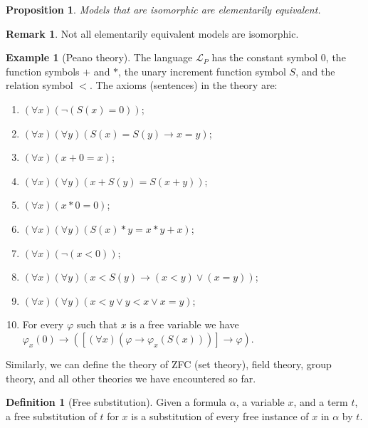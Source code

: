 \documentclass[11pt,a4paper]{article}
\theoremstyle{definition}
\newtheorem{definition}{Definition}[section]
\newtheorem{remark}{Remark}[section]
\newtheorem{example}{Example}[section]
\theoremstyle{plain}
\newtheorem{proposition}[theorem]{Proposition}
\renewcommand{\L}{\mathcal{L}}
\renewcommand{\implies}{\rightarrow}
\begin{document}
  \begin{proposition}
    Models that are isomorphic are elementarily equivalent.
  \end{proposition}
  \begin{remark}
    Not all elementarily equivalent models are isomorphic.
  \end{remark}

  \begin{example}[Peano theory]
    The language $\L_P$ has the constant symbol $0$, the function symbols
    $+$ and $*$, the unary increment function symbol $S$, and the relation
    symbol $<$. The axioms (sentences) in the theory are:
    \begin{enumerate}
      \item [(1)] $(\forall x)(\neg (S(x) = 0))$;
      \item [(2)] $(\forall x)(\forall y)(S(x) = S(y) \implies x =y)$;
      \item [(3)] $(\forall x)(x + 0 = x)$;
      \item [(4)] $(\forall x)(\forall y)(x + S(y) = S(x + y))$;
      \item [(5)] $(\forall x)(x * 0 = 0)$;
      \item [(6)] $(\forall x)(\forall y)(S(x) * y = x * y + x)$;
      \item [(7)] $(\forall x)(\neg (x < 0))$;
      \item [(8)] $(\forall x)(\forall y)
        (x < S(y) \implies (x < y) \lor (x=y))$;
      \item [(9)] $(\forall x)(\forall y)(x < y \lor y < x \lor x = y)$;
      \item [(10)] For every $\varphi$ such that $x$ is a free variable 
        we have $\varphi_x(0) \implies \left(\left[(\forall x)
        (\varphi \implies \varphi_x(S(x)))\right] \implies \varphi \right)$.
    \end{enumerate}
  \end{example}

  Similarly, we can define the theory of ZFC (set theory), field theory,
  group theory, and all other theories we have encountered so far.

  \begin{definition}[Free substitution]
    Given a formula $\alpha$, a variable $x$, and a term $t$,
    a free substitution of $t$ for $x$ is a substitution of every
    free instance of $x$ in $\alpha$ by $t$.
  \end{definition}
\end{document}
